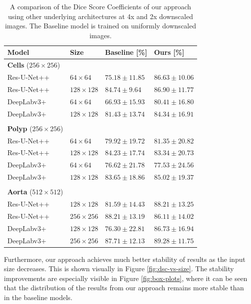 \begin{table}[t!]
\caption{A comparison of the Dice Score Coefficients of our approach using other underlying architectures at 4x and 2x downscaled images. The Baseline model is trained on uniformly downscaled images.\label{tab:other-sota}}
		\begin{tabularx}{\textwidth}{lCCC}
			\textbf{Model} & \textbf{Size} & \textbf{Baseline [\%]} & \textbf{Ours [\%]}\\
\toprule
\textbf{Cells} ($256 \times 256$) & & & \\
\midrule
Res-U-Net++ & $64 \times 64$ & $75.18 \pm 11.85$ & $86.63 \pm 10.06$ \\
Res-U-Net++ & $128 \times 128$ & $84.74 \pm 9.64$ & $86.90 \pm 11.77$ \\
\midrule
DeepLabv3+ & $64 \times 64$ & $66.93 \pm 15.93$ & $80.41 \pm 16.80$ \\
DeepLabv3+ & $128 \times 128$ & $81.43 \pm 13.74$ & $84.34 \pm 16.91$ \\
\bottomrule \\
\toprule
\textbf{Polyp} ($256 \times 256$) & & & \\
\midrule
Res-U-Net++ & $64 \times 64$ & $79.92 \pm 19.72$ & $81.35 \pm 20.82$ \\
Res-U-Net++ & $128 \times 128$ & $84.23 \pm 17.74$ & $83.34 \pm 20.73$ \\
\midrule
DeepLabv3+ & $64 \times 64$ & $76.62 \pm 21.78$ & $77.53 \pm 24.56$ \\
DeepLabv3+ & $128 \times 128$ & $83.65 \pm 18.86$ & $85.02 \pm 19.37$ \\
\bottomrule \\
\toprule
\textbf{Aorta} ($512 \times 512$) & & & \\
\midrule
Res-U-Net++ & $128 \times 128$ & $81.59 \pm 14.43$ & $88.21 \pm 13.25$ \\
Res-U-Net++ & $256 \times 256$ & $88.21 \pm 13.19$ & $86.11 \pm 14.02$ \\
\midrule
DeepLabv3+ & $128 \times 128$ & $76.30 \pm 22.81$ & $86.73 \pm 16.94$ \\
DeepLabv3+ & $256 \times 256$ & $87.71 \pm 12.13$ & $89.28 \pm 11.75$ \\
\end{tabularx}
\end{table}

Furthermore, our approach achieves much better stability of results as the input size decreases. This is shown visually in Figure \ref{fig:dsc-vs-size}. The stability improvements are especially visible in Figure \ref{fig:box-plots}, where it can be seen that the distribution of the results from our approach remains more stable than in the baseline models.

